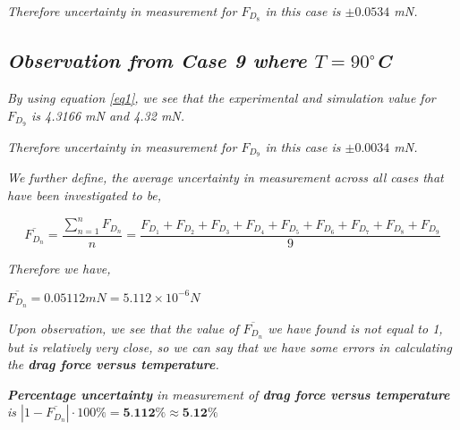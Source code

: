 	\textit{Therefore uncertainty in measurement for $F_{D_8}$ in this case is $\pm{\textit{0.0534}}$ mN.}        
                
\subsection{\textit{Observation from Case 9 where $T = 90^\circ$C}}
        
	\textit{By using equation \ref{eq1}, we see that the experimental and simulation value for $F_{D_9}$ is 4.3166 mN and 4.32 mN.}
        
	\textit{Therefore uncertainty in measurement for $F_{D_9}$ in this case is $\pm{\textit{0.0034}}$ mN.}
        

        

        




\textit{We further define, the average uncertainty in measurement across all cases that have been investigated to be,} 

    $$\overline{F_{D_n}} = \frac{\sum_{n=1}^{n}F_{D_n}}{n} = \frac{F_{D_1} + F_{D_2} + F_{D_3} + F_{D_4} + F_{D_5} + F_{D_6} + F_{D_7} + F_{D_8} + F_{D_9}}{9}$$

\textit{Therefore we have,}

    $\overline{F_{D_n}} = 0.05112 mN = 5.112\times 10^{-6} N$

\textit{Upon observation, we see that the value of $\overline{F_{D_n}}$ we have found is not equal to 1, but is relatively very close, so we can say that we have some errors in calculating the \textbf{drag force versus temperature}.}
        
        \textit{\textbf{Percentage uncertainty} in measurement of \textbf{drag force versus temperature} is $\left|1-\overline{F_{D_n}}\right|\cdot{100\%} = \textbf{5.112\%} \approx \textbf{5.12\%}$}
        



